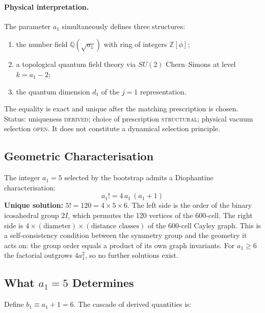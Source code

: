 \documentclass[12pt,a4paper]{article}
\theoremstyle{definition}
\begin{document}
\paragraph{Physical interpretation.}
The parameter $a_1$ simultaneously defines three structures:
\begin{enumerate}
\item[(i)] the number field $\mathbb{Q}(\sqrt{a_1})$ with ring of integers $\mathbb{Z}[\phi]$;
\item[(ii)] a topological quantum field theory via $SU(2)$ Chern--Simons at level $k = a_1 - 2$;
\item[(iii)] the quantum dimension $d_1$ of the $j = 1$ representation.
\end{enumerate}
The equality is exact and unique after the matching prescription is chosen.  Status: uniqueness \textsc{derived}; choice of prescription \textsc{structural}; physical vacuum selection \textsc{open}.  It does not constitute a dynamical selection principle.

\subsection{Geometric Characterisation}

The integer $a_1 = 5$ selected by the bootstrap admits a Diophantine characterisation:
\begin{equation}
\boxed{a_1! = 4\,a_1\,(a_1 + 1)}
\label{eq:diophantine}
\end{equation}
\textbf{Unique solution:} $5! = 120 = 4 \times 5 \times 6$.  The left side is the order of the binary icosahedral group $2I$, which permutes the 120 vertices of the 600-cell.  The right side is $4 \times (\text{diameter}) \times (\text{distance classes})$ of the 600-cell Cayley graph.  This is a self-consistency condition between the symmetry group and the geometry it acts on: the group order equals a product of its own graph invariants.  For $a_1 \ge 6$ the factorial outgrows $4a_1^2$, so no further solutions exist.

\subsection{What \texorpdfstring{$a_1 = 5$}{a1 = 5} Determines}
\label{sec:cascade}

Define $b_1 \equiv a_1 + 1 = 6$. The cascade of derived quantities is:
\end{document}
